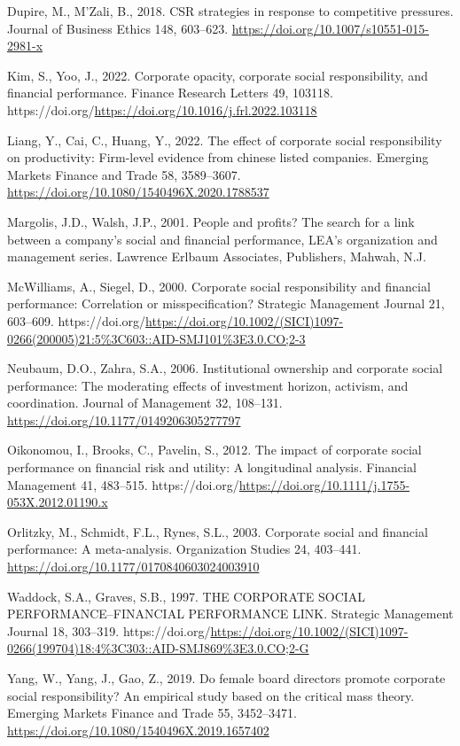 \documentclass[
  letterpaper,
  DIV=11,
  numbers=noendperiod]{scrartcl}
\newlength{\cslhangindent}
\newenvironment{CSLReferences}[2] %
 {\begin{list}{}{%
  \setlength{\itemindent}{0pt}
  \setlength{\leftmargin}{0pt}
  \setlength{\parsep}{0pt}
  \ifodd #1
   \setlength{\leftmargin}{\cslhangindent}
   \setlength{\itemindent}{-1\cslhangindent}
  \fi
  \setlength{\itemsep}{#2\baselineskip}}}
 {\end{list}}
\begin{document}
\begin{CSLReferences}{1}{0}
Dupire, M., M'Zali, B., 2018. CSR strategies in response to competitive
pressures. Journal of Business Ethics 148, 603--623.
\url{https://doi.org/10.1007/s10551-015-2981-x}

Kim, S., Yoo, J., 2022. Corporate opacity, corporate social
responsibility, and financial performance. Finance Research Letters 49,
103118. https://doi.org/\url{https://doi.org/10.1016/j.frl.2022.103118}

Liang, Y., Cai, C., Huang, Y., 2022. The effect of corporate social
responsibility on productivity: Firm-level evidence from chinese listed
companies. Emerging Markets Finance and Trade 58, 3589--3607.
\url{https://doi.org/10.1080/1540496X.2020.1788537}

Margolis, J.D., Walsh, J.P., 2001. People and profits? The search for a
link between a company's social and financial performance, LEA's
organization and management series. Lawrence Erlbaum Associates,
Publishers, Mahwah, N.J.

McWilliams, A., Siegel, D., 2000. Corporate social responsibility and
financial performance: Correlation or misspecification? Strategic
Management Journal 21, 603--609.
https://doi.org/\url{https://doi.org/10.1002/(SICI)1097-0266(200005)21:5\%3C603::AID-SMJ101\%3E3.0.CO;2-3}

Neubaum, D.O., Zahra, S.A., 2006. Institutional ownership and corporate
social performance: The moderating effects of investment horizon,
activism, and coordination. Journal of Management 32, 108--131.
\url{https://doi.org/10.1177/0149206305277797}

Oikonomou, I., Brooks, C., Pavelin, S., 2012. The impact of corporate
social performance on financial risk and utility: A longitudinal
analysis. Financial Management 41, 483--515.
https://doi.org/\url{https://doi.org/10.1111/j.1755-053X.2012.01190.x}

Orlitzky, M., Schmidt, F.L., Rynes, S.L., 2003. Corporate social and
financial performance: A meta-analysis. Organization Studies 24,
403--441. \url{https://doi.org/10.1177/0170840603024003910}

Waddock, S.A., Graves, S.B., 1997. THE CORPORATE SOCIAL
PERFORMANCE--FINANCIAL PERFORMANCE LINK. Strategic Management Journal
18, 303--319.
https://doi.org/\url{https://doi.org/10.1002/(SICI)1097-0266(199704)18:4\%3C303::AID-SMJ869\%3E3.0.CO;2-G}

Yang, W., Yang, J., Gao, Z., 2019. Do female board directors promote
corporate social responsibility? An empirical study based on the
critical mass theory. Emerging Markets Finance and Trade 55, 3452--3471.
\url{https://doi.org/10.1080/1540496X.2019.1657402}

\end{CSLReferences}
\end{document}
